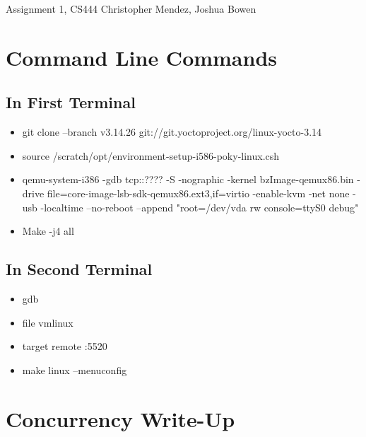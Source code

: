 \documentclass[letterpaper,10pt,titlepage]{article}
\begin{document}
Assignment 1, CS444
Christopher Mendez, Joshua Bowen



\section{Command Line Commands}
\subsection{In First Terminal}
\begin{itemize}
\item git clone --branch v3.14.26 git://git.yoctoproject.org/linux-yocto-3.14
\item source /scratch/opt/environment-setup-i586-poky-linux.csh
\item \sloppy qemu-system-i386 -gdb tcp::???? -S -nographic -kernel bzImage-qemux86.bin -drive file=core-image-lsb-sdk-qemux86.ext3,if=virtio -enable-kvm -net none -usb -localtime --no-reboot --append "root=/dev/vda rw console=ttyS0 debug"
\item Make -j4 all
\end{itemize}
\subsection{In Second Terminal}
\begin{itemize}
\item gdb
\item file vmlinux
\item target remote :5520
\item make linux --menuconfig
\end{itemize}

\section{Concurrency Write-Up}
\end{document}
